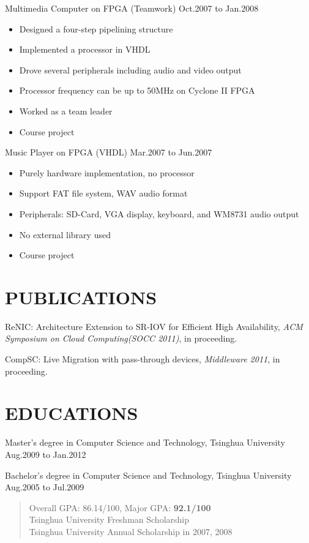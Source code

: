 \documentclass[11pt]{res} %
\begin{document}
\begin{resume}
Multimedia Computer on FPGA (Teamwork) \hfill Oct.2007 to Jan.2008

\begin{itemize} \itemsep -2pt
\item Designed a four-step pipelining structure
\item Implemented a processor in VHDL
\item Drove several peripherals including audio and video output
\item Processor frequency can be up to 50MHz on Cyclone II FPGA
\item Worked as a team leader
\item Course project
\end{itemize}

Music Player on FPGA (VHDL) \hfill Mar.2007 to Jun.2007

\begin{itemize} \itemsep -2pt
\item Purely hardware implementation, no processor
\item Support FAT file system, WAV audio format
\item Peripherals: SD-Card, VGA display, keyboard, and WM8731 audio output
\item No external library used
\item Course project
\end{itemize}

\section{PUBLICATIONS}
ReNIC: Architecture Extension to SR-IOV for Efficient High
Availability, \emph{ACM Symposium on Cloud Computing(SOCC 2011)}, in
proceeding.

CompSC: Live Migration with pass-through devices, \emph{Middleware 2011}, in proceeding.

\section{EDUCATIONS}
Master's degree in Computer Science and Technology, Tsinghua University \\
\hspace*{\fill} Aug.2009 to Jan.2012

Bachelor's degree in Computer Science and Technology, Tsinghua University \\
\hspace*{\fill} Aug.2005 to Jul.2009
\begin{quote}
Overall GPA: 86.14/100, Major GPA: \textbf{92.1/100} \\
Tsinghua University Freshman Scholarship \\
Tsinghua University Annual Scholarship in 2007, 2008 \\
\end{quote}


\end{resume}
\end{document}
